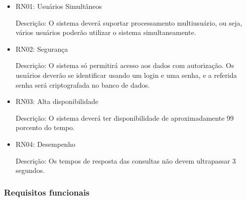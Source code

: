 \begin{itemize}
	
	
\item RN01: Usuários Simultâneos


Descrição: O sistema deverá suportar processamento multiusuário, ou seja, vários usuários poderão utilizar o sistema simultaneamente. 


\item RN02: Segurança 


Descrição: O sistema só permitirá acesso aos dados com autorização. Os usuários deverão se identificar usando um login e uma senha, e a referida senha será criptografada no banco de dados.


\item RN03: Alta disponibilidade 


Descrição: O sistema deverá ter disponibilidade de aproximadamente 99 porcento do tempo. 


\item RN04: Desempenho


Descrição: Os tempos de resposta das consultas não devem ultrapassar 3 segundos.


\end{itemize}
	

\subsubsection{Requisitos funcionais}


